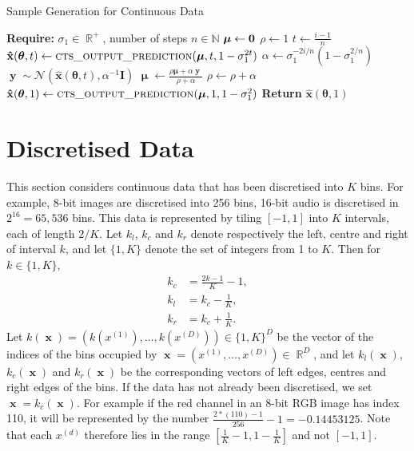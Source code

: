 \documentclass[11pt,table]{article}
\DeclareMathOperator{\x}{\mathbf{x}}
\DeclareMathOperator{\y}{\mathbf{y}}
\DeclareMathOperator{\m}{\boldsymbol{\mu}}
\newcommand{\N}[2]{\mathcal{N}\left(#1 , #2\right)}
\newcommand{\bc}[1]{#1_c}
\DeclareMathOperator{\R}{\mathbb{R}}
\newcommand{\I}[1]{\boldsymbol{I}}
\newcommand{\didx}[2]{#1^{(#2)}}
\renewcommand{\vec}[1]{\boldsymbol{#1}}
\newcommand{\pars}{\theta}
\newcommand{\parsn}{\vec{\pars}}
\newcommand{\0}[1]{\constvec{0}{#1}}
\newcommand{\1}[1]{\constvec{1}{#1}}
\newcommand{\xdd}[1]{\didx{x}{#1}}
\newcommand{\ds}[1]{\{1,#1\}}
\newcommand{\dsd}[2]{\ds{#1}^{#2}}
\newcommand{\pred}[1]{\hat{#1}}
\begin{document}
\begin{algorithm}[H]
\caption{Sample Generation for Continuous Data}\label{alg:samp_gen_cts}
\begin{algorithmic}
\State \textbf{Require:} $\sigma_1 \in \R^+$, number of steps $n \in \mathbb{N}$
\State $\boldsymbol{\mu} \gets \0{D}$
\State $\rho \gets 1$
    \State $t \leftarrow \frac{i-1}{n}$
    \State $\mathbf{\pred{x}}(\parsn, t) \leftarrow \text{\sc{\lstinline{cts_output_prediction}}}(\m, t, 1 - \sigma_1^{2 t})$
    \State $\alpha \gets \sigma_1^{-2 i / n} \left(1-\sigma_1^{2/n}\right)$
    \State $\y \sim \N{\mathbf{\pred{x}}(\parsn, t)}{\alpha^{-1}\I{D}}$
    \State $\m \gets \frac{\rho\boldsymbol{\mu} + \alpha\y}{\rho + \alpha}$
    \State $\rho \gets \rho + \alpha$
\EndFor
\State $\mathbf{\pred{x}}(\parsn, 1) \gets \text{\sc{\lstinline{cts_output_prediction}}}(\m, 1, 1 - \sigma_1^{2})$
\State \textbf{Return} $\mathbf{\pred{x}}(\parsn, 1)$
\end{algorithmic}
\end{algorithm}
\section{Discretised Data}\label{sec:discretised}
This section considers continuous data that has been discretised into $K$ bins.
For example, 8-bit images are discretised into 256 bins, 16-bit audio is discretised in $2^{16} = 65,536$ bins.
This data is represented by tiling $[-1, 1]$ into $K$ intervals, each of length $2/K$.
Let $k_{l}$, $\bc{k}$ and $k_{r}$ denote respectively the left, centre and right of interval $k$, and let $\ds{K}$ denote the set of integers from 1 to $K$.
Then for $k \in \ds{K}$,
 \begin{align}
\bc{k} &= \frac{2k - 1}{K} - 1,\\
k_{l} &= \bc{k} - \frac{1}{K},\\
k_{r} &= \bc{k} + \frac{1}{K}.
\end{align}
Let $k(\x) = \left(k(\xdd{1}),\dots, k(\xdd{D})\right) \in \dsd{K}{D}$ be the vector of the indices of the bins occupied by $\x = \left(\didx{x}{1},\dots, \didx{x}{D}\right) \in \R^D$, and let $k_l(\x)$, $k_c(\x)$ and $k_r(\x)$ be the corresponding vectors of left edges, centres and right edges of the bins.
If the data has not already been discretised, we set $\x = k_c(\x)$.
For example if the red channel in an 8-bit RGB image has index 110, it will be represented by the number $\frac{2*(110) - 1}{256} - 1 = -0.14453125$.
Note that each $\didx{x}{d}$ therefore lies in the range $[\frac{1}{K}-1,1-\frac{1}{K}]$ and not $[-1, 1]$.
\end{document}
